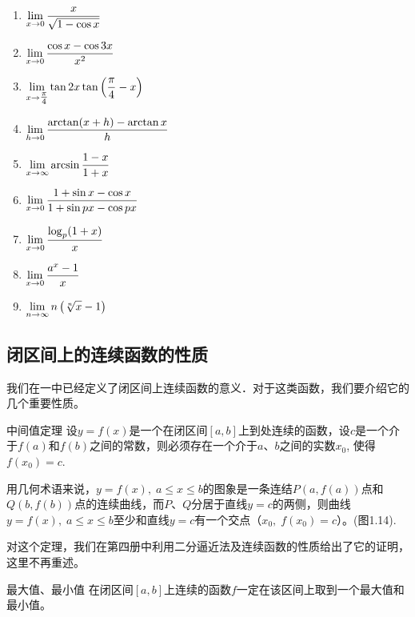 \begin{ex}
\begin{enumerate}
\begin{multicols}{2}
\begin{enumerate}
\item $\Lim_{x\to 0}\frac{x}{\sqrt{1-\cos x}}$
\item $\Lim_{x\to 0}\frac{\cos x-\cos 3x}{x^2}$
\item $\Lim_{x\to \tfrac{\pi}{4}}\tan 2x\tan\left(\frac{\pi}{4}-x\right)$
\item $\Lim_{h\to 0}\frac{\arctan (x+h)-\arctan x}{h}$
\item $\Lim_{x\to \infty}\arcsin \frac{1-x}{1+x}$
\item $\Lim_{x\to 0}\frac{1+\sin x-\cos x}{1+\sin px-\cos px}$
\item $\Lim_{x\to 0}\frac{\log_p(1+x)}{x}$
\item $\Lim_{x\to 0}\frac{a^x-1}{x}$
\item $\Lim_{n\to \infty}n\left(\sqrt[n]{x}-1\right)$
    \end{enumerate}
\end{multicols}
\end{enumerate}
\end{ex}

\subsection{闭区间上的连续函数的性质}

我们在一中已经定义了闭区间上连续函数的意义．对于这类函数，我们要介绍它的几个重要性质。

\begin{blk}
    {中间值定理} 设$y=f(x)$是一个在闭区间$[a,b]$上到处连续的函数，设$c$是一个介于$f(a)$和$f(b)$之间的常数，则必须存在一个介于$a$、$b$之间的实数$x_0$, 使得$f(x_0)=c$.
\end{blk}

用几何术语来说，$y=f(x),\; a\le x\le b$的图象是一条连结$P(a,f(a))$点和$Q(b,f(b))$点的连续曲线，而$P$、$Q$分居于直线$y=c$的两侧，则曲线$y=f(x),\; a\le x\le b$至少和直线$y=c$有一个交点（$x_0,\; f(x_0)=c$）。(图1.14).
\begin{figure}[htp]
    \centering
\begin{tikzpicture}
    
\end{tikzpicture}
    \caption{}
\end{figure}


对这个定理，我们在第四册中利用二分逼近法及连续函数的性质给出了它的证明，这里不再重述。

\begin{blk}
 {最大值、最小值} 在闭区间$[a,b]$上连续的函数$f$一定在该区间上取到一个最大值和最小值。  
\end{blk}

